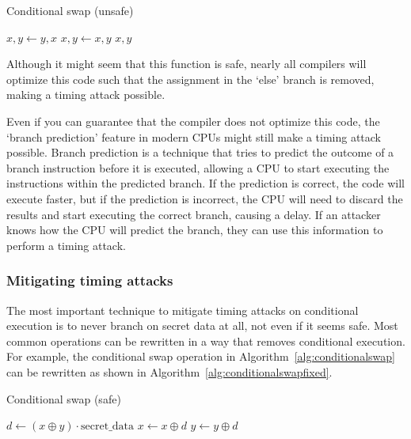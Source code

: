 \documentclass[11pt,a4paper]{report}
\theoremstyle{definition}
\begin{document}
\begin{algorithm}
  \caption{Conditional swap (unsafe)}
  \label{alg:conditionalswap}
  \begin{algorithmic}[1]
    \State $x, y \gets y, x$
    \Else
    \State $x, y \gets x, y$
    \EndIf
    \State \Return $x, y$
    \EndFunction
  \end{algorithmic}
\end{algorithm}

Although it might seem that this function is safe, nearly all compilers will optimize this code such that the assignment in the `else' branch is removed, making a timing attack possible.

Even if you can guarantee that the compiler does not optimize this code, the `branch prediction' feature in modern CPUs might still make a timing attack possible. Branch prediction is a technique that tries to predict the outcome of a branch instruction before it is executed, allowing a CPU to start executing the instructions within the predicted branch. If the prediction is correct, the code will execute faster, but if the prediction is incorrect, the CPU will need to discard the results and start executing the correct branch, causing a delay. If an attacker knows how the CPU will predict the branch, they can use this information to perform a timing attack.

\subsubsection{Mitigating timing attacks}
The most important technique to mitigate timing attacks on conditional execution is to never branch on secret data at all, not even if it seems safe. Most common operations can be rewritten in a way that removes conditional execution. For example, the conditional swap operation in Algorithm~\ref{alg:conditionalswap} can be rewritten as shown in Algorithm~\ref{alg:conditionalswapfixed}.

\begin{algorithm}
  \caption{Conditional swap (safe)}
  \label{alg:conditionalswapfixed}
  \begin{algorithmic}[1]
    \State $d \gets (x \oplus y) \cdot \text{secret\_data}$ 
    \State $x \gets x \oplus d$
    \State $y \gets y \oplus d$
    \EndFunction
  \end{algorithmic}
\end{algorithm}
\end{document}
